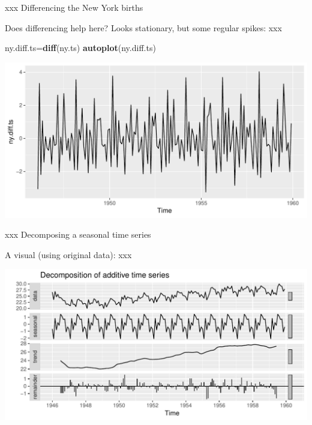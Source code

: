 \documentclass[ignorenonframetext,]{beamer}
\newenvironment{Shaded}{\begin{snugshade}}{\end{snugshade}}
\newcommand{\KeywordTok}[1]{\textcolor[rgb]{0.13,0.29,0.53}{\textbf{#1}}}
\newcommand{\NormalTok}[1]{#1}
\newcommand{\OperatorTok}[1]{\textcolor[rgb]{0.81,0.36,0.00}{\textbf{#1}}}
\newcommand{\StringTok}[1]{\textcolor[rgb]{0.31,0.60,0.02}{#1}}
\begin{document}
\begin{frame}[fragile]{xxx Differencing the New York births}
\protect\hypertarget{xxx-differencing-the-new-york-births}{}

Does differencing help here? Looks stationary, but some regular spikes:
xxx

\begin{Shaded}
\begin{Highlighting}[]
\NormalTok{ny.diff.ts=}\KeywordTok{diff}\NormalTok{(ny.ts)}
\KeywordTok{autoplot}\NormalTok{(ny.diff.ts)}
\end{Highlighting}
\end{Shaded}

\includegraphics{figure/unnamed-chunk-21-1.pdf}

\end{frame}

\begin{frame}[fragile]{xxx Decomposing a seasonal time series}
\protect\hypertarget{xxx-decomposing-a-seasonal-time-series}{}

A visual (using original data): xxx

\begin{Shaded}
\end{Shaded}

\includegraphics{figure/unnamed-chunk-22-1.pdf}

\end{frame}
\end{document}
